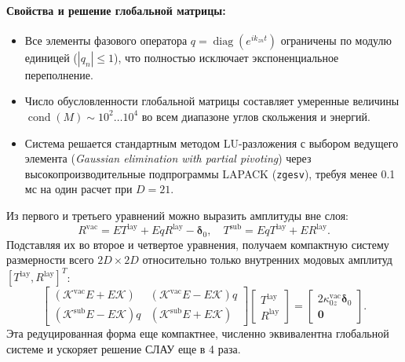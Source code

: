 \documentclass[a4paper,11pt]{article}
\begin{document}
\paragraph{Свойства и решение глобальной матрицы:}
\begin{itemize}
    \item Все элементы фазового оператора $q = \operatorname{diag}(e^{i k_{zn} t})$ ограничены по модулю единицей ($|q_n| \le 1$), что полностью исключает экспоненциальное переполнение.
    \item Число обусловленности глобальной матрицы составляет умеренные величины $\operatorname{cond}(M) \sim 10^2 \dots 10^4$ во всем диапазоне углов скольжения и энергий.
    \item Система решается стандартным методом LU-разложения с выбором ведущего элемента (\textit{Gaussian elimination with partial pivoting}) через высокопроизводительные подпрограммы LAPACK (\texttt{zgesv}), требуя менее 0.1 мс на один расчет при $D = 21$.
\end{itemize}

\begin{remarkbox}
Из первого и третьего уравнений можно выразить амплитуды вне слоя:
\begin{equation}
    R^{\text{vac}} = E T^{\text{lay}} + E q R^{\text{lay}} - \boldsymbol{\delta}_0, \quad T^{\text{sub}} = E q T^{\text{lay}} + E R^{\text{lay}}.
\end{equation}
Подставляя их во второе и четвертое уравнения, получаем компактную систему размерности всего $2D \times 2D$ относительно только внутренних модовых амплитуд $[T^{\text{lay}}, R^{\text{lay}}]^T$:
\begin{equation}
\begin{bmatrix}
    (\mathcal{K}^{\text{vac}} E + E \mathcal{K}) & (\mathcal{K}^{\text{vac}} E - E \mathcal{K}) q \\
    (\mathcal{K}^{\text{sub}} E - E \mathcal{K}) q & (\mathcal{K}^{\text{sub}} E + E \mathcal{K})
\end{bmatrix}
\begin{bmatrix}
    T^{\text{lay}} \\
    R^{\text{lay}}
\end{bmatrix}
=
\begin{bmatrix}
    2 \kappa_{0z}^{\text{vac}} \boldsymbol{\delta}_0 \\
    \mathbf{0}
\end{bmatrix}.
\label{eq:condensed_2d_system}
\end{equation}
Эта редуцированная форма еще компактнее, численно эквивалентна глобальной системе и ускоряет решение СЛАУ еще в 4 раза.
\end{remarkbox}
\end{document}
